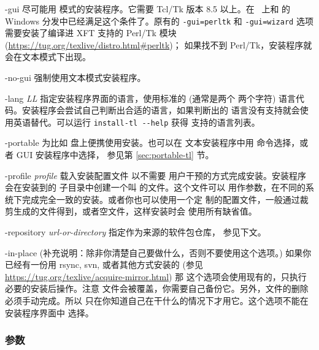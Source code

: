 \documentclass{article}
\begin{document}
\begin{ttdescription}
  \item[-gui] 尽可能用 \GUI{} 模式的安装程序。它需要 Tcl/Tk 版本 8.5 以上。在
  \MacOSX\ 上和 \TL{} 的 Windows 分发中已经满足这个条件了。原有的
  \texttt{-gui=perltk} 和 \texttt{-gui=wizard} 选项需要安装了编译进 XFT 支持的
  Perl/Tk 模块 (\url{https://tug.org/texlive/distro.html#perltk})；
  如果找不到 Perl/Tk，安装程序就会在文本模式下出现。

  \item[-no-gui] 强制使用文本模式安装程序。

  \item[-lang {\sl LL}] 指定安装程序界面的语言，使用标准的 (通常是两个
  两个字符) 语言代码。安装程序会尝试自己判断出合适的语言，如果判断出的
  语言没有支持就会使用英语替代。可以运行 \verb|install-tl --help| 获得
  支持的语言列表。

  \item[-portable] 为比如 \USB{} 盘上便携使用安装。也可以在
  文本安装程序中用  命令选择，或者 GUI 安装程序中选择，
  参见第 \ref{sec:portable-tl} 节。

  \item[-profile {\sl profile}] 载入安装配置文件  以不需要
  用户干预的方式完成安装。安装程序会在安装到的 
  子目录中创建一个叫  的文件。这个文件可以
  用作参数，在不同的系统下完成完全一致的安装。或者你也可以使用一个定
  制的配置文件，一般通过裁剪生成的文件得到，或者空文件，这样安装时会
  使用所有缺省值。

  \item [-repository {\sl url-or-directory}] 指定作为来源的软件包仓库，
  参见下文。

  \item[-in-place] (补充说明：除非你清楚自己要做什么，否则不要使用这个选项。)
  如果你已经有一份用 rsync, svn, 或者其他方式安装的
  \TL{} (参见 \url{https://tug.org/texlive/acquire-mirror.html}) 那
  这个选项会使用现有的，只执行必要的安装后操作。注意 
  文件会被覆盖，你需要自己备份它。另外，文件的删除必须手动完成。所以
  只在你知道自己在干什么的情况下才用它。这个选项不能在安装程序界面中
  选择。

\end{ttdescription}

\subsubsection{ 参数}
\label{sec:location}
\end{document}
